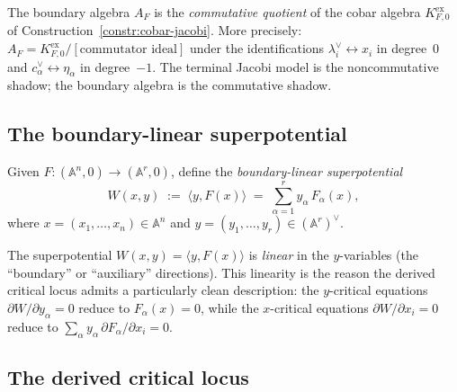 \begin{remark}
\label{rem:boundary-jacobi-relation}
The boundary algebra $A_F$ is the \emph{commutative quotient} of
the cobar algebra $K^{\mathrm{ex}}_{F,0}$ of
Construction~\ref{constr:cobar-jacobi}. More precisely:
$A_F = K^{\mathrm{ex}}_{F,0} / [\text{commutator ideal}]$
under the identifications $\lambda_i^\vee \leftrightarrow x_i$
in degree~$0$ and $c_\alpha^\vee \leftrightarrow \eta_\alpha$
in degree~$-1$. The terminal Jacobi model is the noncommutative
shadow; the boundary algebra is the commutative shadow.
\end{remark}

\subsection{The boundary-linear superpotential}

\begin{definition}
\label{def:boundary-linear-W}
Given $F\colon (\mathbb{A}^n, 0) \to (\mathbb{A}^r, 0)$, define the
\emph{boundary-linear superpotential}
\begin{equation}\label{eq:boundary-linear-W}
W(x, y) \;:=\; \langle y, F(x) \rangle
\;=\; \sum_{\alpha=1}^{r} y_\alpha\, F_\alpha(x),
\end{equation}
where $x = (x_1, \ldots, x_n) \in \mathbb{A}^n$ and
$y = (y_1, \ldots, y_r) \in (\mathbb{A}^r)^\vee$.
\end{definition}

\begin{remark}
\label{rem:why-boundary-linear}
The superpotential $W(x,y) = \langle y, F(x) \rangle$ is
\emph{linear} in the $y$-variables (the ``boundary'' or
``auxiliary'' directions). This linearity is the reason the
derived critical locus admits a particularly clean description:
the $y$-critical equations $\partial W / \partial y_\alpha = 0$
reduce to $F_\alpha(x) = 0$, while the $x$-critical equations
$\partial W / \partial x_i = 0$ reduce to
$\sum_\alpha y_\alpha \, \partial F_\alpha / \partial x_i = 0$.
\end{remark}

\subsection{The derived critical locus}

